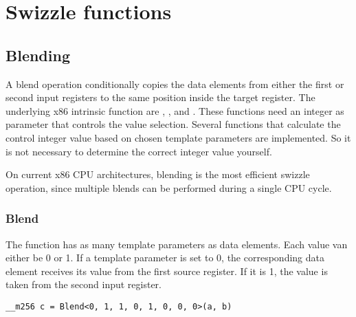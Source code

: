 \section{Swizzle functions}


\subsection{Blending}

A blend operation conditionally copies the data elements from either the first or second input registers to the same position inside the target register. 
The underlying x86 intrinsic function are , ,  and .
These functions need an integer as parameter that controls the value selection.
Several functions that calculate the control integer value based on chosen template parameters are implemented.
So it is not necessary to determine the correct integer value yourself.

On current x86 CPU architectures, blending is the most efficient swizzle operation, since multiple blends can be performed during a single CPU cycle.

\subsubsection{Blend}

The  function has as many template parameters as data elements.
Each value van either be 0 or 1.
If a template parameter is set to 0, the corresponding data element receives its value from the first source register.
If it is 1, the value is taken from the second input register.

\begin{verbatim}
__m256 c = Blend<0, 1, 1, 0, 1, 0, 0, 0>(a, b)
\end{verbatim}




